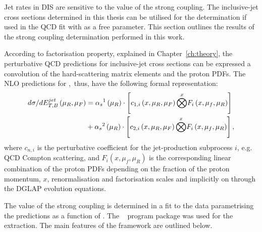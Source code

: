 Jet rates in DIS are sensitive to the value of the strong coupling. The inclusive-jet cross sections determined in this thesis can be utilised for the \as determination if used in the QCD fit with \as as a free parameter. This section outlines the results of the strong coupling determination performed in this work.

According to factorisation property, explained in Chapter~\ref{ch:theory}, the perturbative QCD predictions for inclusive-jet cross sections can be expressed a convolution of the hard-scattering matrix elements and the proton PDFs. The NLO predictions for \dsdetjetb,~thus, have the following formal representation:
\begin{equation}
	\begin{split}
\mbox{$d\sigma/dE_{T,B}^{jet}$}\left( \mu_R, \mu_F\right) &= \mbox{$\alpha_{s}$}^1\left( \mu_R\right) \cdot \left[ c_{1,i}\left( x, \mu_R, \mu_F\right) \overset{x}{\bigotimes } F_i\left( x, \mu_f, \mu_R \right) \right] \\
&+ \mbox{$\alpha_{s}$}^2\left( \mu_R\right) \cdot \left[ c_{2,i}\left( x, \mu_R, \mu_F\right) \overset{x}{\bigotimes } F_i\left( x, \mu_f, \mu_R \right) \right],
	\end{split}
\end{equation}
where $c_{n,i}$ is the perturbative coefficient for the jet-production subprocess $i$, e.g. QCD Compton scattering, and $F_i\left( x, \mu_f, \mu_R \right)$ is the corresponding linear combination of the proton PDFs depending on the fraction of the proton momentum, $x$, renormalisation and factorisation scales and implicitly on \as through the DGLAP evolution equations.

The value of the strong coupling is determined in a fit to the data parametrising the predictions as a function of \as. The \herafitter~\cite{herafitter} program package was used for the \as extraction. The main features of the \herafitter framework are outlined below.

